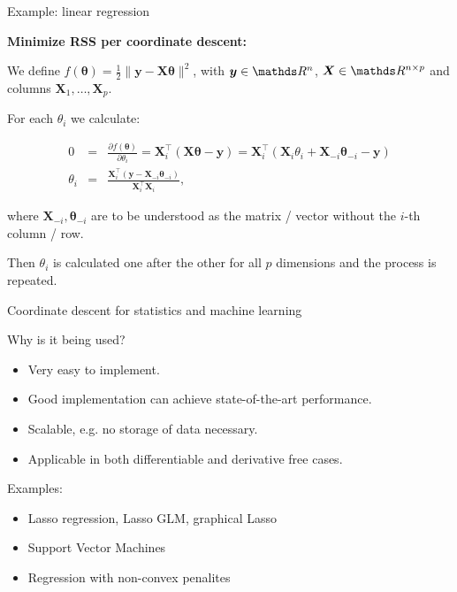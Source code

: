 \documentclass[11pt,compress,t,notes=noshow, xcolor=table]{beamer}
\begin{document}
\begin{vbframe}{Example: linear regression}

\textbf{Minimize RSS per coordinate descent:}

We define $f(\bm{\theta}) = \frac{1}{2} \|\bm{y} - \bm{X}\bm{\theta}\|^2$,
with $\bm{y} \in \R^n$, $\bm{X} \in \R^{n \times p}$ and columns $\bm{X}_1, \hdots, \bm{X}_p$.

\lz

For each  $\theta_i$ we calculate:

\begin{footnotesize}
\begin{eqnarray*}
  0 &=& \frac{\partial{f}(\bm{\theta})}{\partial \theta_i}  = \bm{X}_i^{\top} (\bm{X\theta} - \bm{y}) = \bm{X}_i^{\top} (\bm{X}_i \theta_i + \bm{X}_{-i} \bm{\theta}_{-i} - \bm{y}) \\
\theta_i &=& \frac{\bm{X}_i^\top (\bm{y} - \bm{X}_{-i} \bm{\theta}_{-i})}{\bm{X}_i^{\top} \bm{X}_i},
\end{eqnarray*}
\end{footnotesize}

where $\bm{X}_{-i}, \bm{\theta}_{-i}$ are to be understood as the matrix / vector without the $i$-th column / row.

\vspace*{0.2cm}

Then $\theta_i$ is calculated one after the other for all $p$ dimensions and the process is repeated.




\end{vbframe}

\begin{vbframe}{Coordinate descent for statistics and machine learning}

Why is it being used?

\begin{itemize}
\item Very easy to implement.
\item Good implementation can achieve state-of-the-art performance.
\item Scalable, e.g. no storage of data necessary.
\item Applicable in both differentiable and derivative free cases.
\end{itemize}

Examples:

\begin{itemize}
\item Lasso regression, Lasso GLM, graphical Lasso
\item Support Vector Machines
\item Regression with non-convex penalites
\end{itemize}




\end{vbframe}


\endlecture
\end{document}
